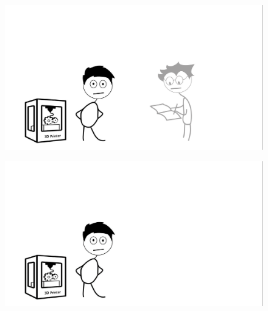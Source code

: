 \begin{frame}
\begin{figure}

\vspace{-.7cm}	
\hspace{-2cm}		\includegraphics[width=1.2\linewidth]{Pictures/animations/animation_5.png}
		\end{figure}

\end{frame}

\begin{frame}
\begin{figure}

\vspace{-.7cm}	
\hspace{-2cm}		\includegraphics[width=1.2\linewidth]{Pictures/animations/animation_6.png}
		\end{figure}

\end{frame}

